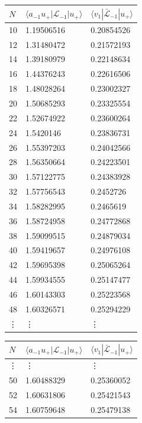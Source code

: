 \documentclass[a4paper,10pt]{article}
\begin{document}
\begin{table}[H]
\center
\begin{minipage}{0.5\textwidth} 
\center
\begin{tabular}{lll}
$N$      & $\langle a_{-1}u_+ | {\mathcal L}_{-1} | u_+ \rangle$  & $\langle v_1 |\bar{\mathcal L}_{-1}| u_+ \rangle$    \\
\hline
10   & 1.19506516 & 0.20854526 \\
 12   & 1.31480472 & 0.21572193 \\
 14   & 1.39180979 & 0.22148634 \\
 16   & 1.44376243 & 0.22616506 \\
 18   & 1.48028264 & 0.23002327 \\
 20   & 1.50685293 & 0.23325554 \\
 22   & 1.52674922 & 0.23600264 \\
 24   & 1.5420146  & 0.23836731 \\
 26   & 1.55397203 & 0.24042566 \\
 28   & 1.56350664 & 0.24223501 \\
 30   & 1.57122775 & 0.24383928 \\
 32   & 1.57756543 & 0.2452726  \\
 34   & 1.58282995 & 0.2465619  \\
 36   & 1.58724958 & 0.24772868 \\
 38   & 1.59099515 & 0.24879034 \\
 40   & 1.59419657 & 0.24976108 \\
 42   & 1.59695398 & 0.25065264 \\
 44   & 1.59934555 & 0.25147477 \\
 46   & 1.60143303 & 0.25223568 \\
 48   & 1.60326571 & 0.25294229 \\
\vdots & \vdots & \vdots  \\ 
\end{tabular}
\end{minipage}%
\begin{minipage}{0.5\textwidth} 
\center
 \begin{tabular}{lll}
 $N$    & $\langle a_{-1}u_+ | {\mathcal L}_{-1} | u_+ \rangle$  & $\langle v_1 |\bar{\mathcal L}_{-1}| u_+ \rangle$    \\
\hline
\vdots & \vdots & \vdots  \\ 
 50   & 1.60488329 & 0.25360052 \\
 52   & 1.60631806 & 0.25421543 \\
 54   & 1.60759648 & 0.25479138 \\

\end{tabular}
\end{minipage}
\end{table}
\end{document}

